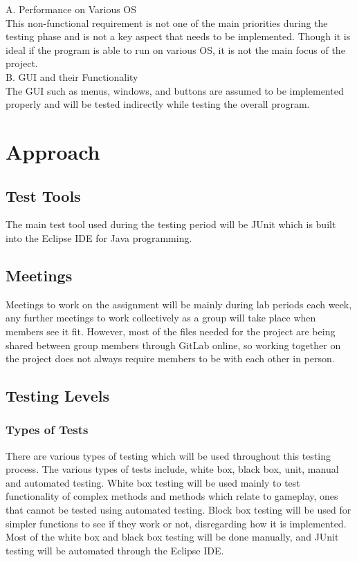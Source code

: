 \documentclass[12pt, letterpaper]{article}
\begin{document}
	\noindent A. \indent Performance on Various OS\\
	
	This non-functional requirement is not one of the main priorities during the testing phase and is not a key aspect that needs to be implemented. Though it is ideal if the program is able to run on various OS, it is not the main focus of the project.\\
	
	\noindent B. \indent GUI and their Functionality\\
	
	The GUI such as menus, windows, and buttons are assumed to be implemented properly and will be tested indirectly while testing the overall program.
	
	\section{Approach}
	\subsection{Test Tools}
	\indent \indent The main test tool used during the testing period will be JUnit which is built into the Eclipse IDE for Java programming.
	
	\subsection{Meetings}
	\indent \indent Meetings to work on the assignment will be mainly during lab periods each week, any further meetings to work collectively as a group will take place when members see it fit. However, most of the files needed for the project are being shared between group members through GitLab online, so working together on the project does not always require members to be with each other in person.
	
	\subsection{Testing Levels}
	
	\subsubsection{Types of Tests}
	\indent \indent There are various types of testing which will be used throughout this testing process. The various types of tests include, white box, black box, unit, manual and automated testing. White box testing will be used mainly to test functionality of complex methods and methods which relate to gameplay, ones that cannot be tested using automated testing. Block box testing will be used for simpler functions to see if they work or not, disregarding how it is implemented. Most of the white box and black box testing will be done manually, and JUnit testing will be automated through the Eclipse IDE.
	
\end{document}

